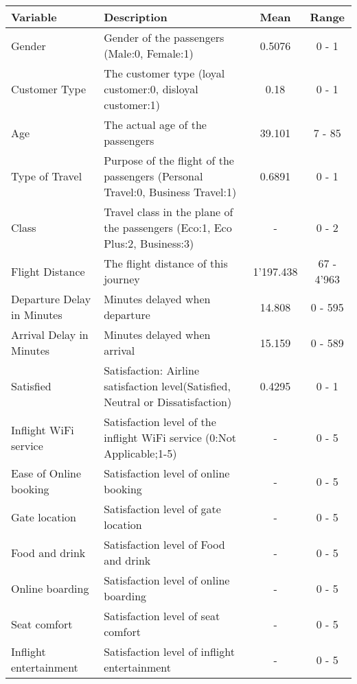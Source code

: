   \begin{landscape}
  \pagestyle{empty}
  \begin{table}[h]
    \centering
    \begin{tabular}{|l|L|c|c|}
      \hline
      \textbf{Variable} & \textbf{Description} & \textbf{Mean} & \textbf{Range} \\
      \hline
      Gender & Gender of the passengers (Male:0, Female:1) & 0.5076 & 0 - 1
      \\\hline 
      Customer Type & The customer type (loyal customer:0, disloyal customer:1) 
      & 0.18 & 0 - 1 \\\hline
      Age & The actual age of the passengers & 39.101 & 7 - 85 \\\hline
      Type of Travel & Purpose of the flight of the passengers
      (Personal Travel:0, Business Travel:1) & 0.6891 & 0 - 1 \\\hline
      Class & Travel class in the plane of the passengers (Eco:1, Eco Plus:2, 
      Business:3) & - & 0 - 2 \\\hline
      Flight Distance & The flight distance of this journey &
      1'197.438 & 67 - 4'963 \\\hline
      Departure Delay in Minutes & Minutes delayed when departure & 14.808 & 0 - 595 \\\hline
      Arrival Delay in Minutes & Minutes delayed when arrival & 15.159 & 0 -
      589 \\\hline
      Satisfied & Satisfaction: Airline satisfaction level(Satisfied, 
      Neutral or Dissatisfaction) & 0.4295 & 0 - 1 \\\hline
      Inflight WiFi service & Satisfaction level of the inflight WiFi service
      (0:Not Applicable;1-5) & - & 0 - 5 \\\hline
      Ease of Online booking & Satisfaction level of online booking & - & 0 - 5
      \\\hline
      Gate location & Satisfaction level of gate location & - & 0 - 5 \\\hline
      Food and drink & Satisfaction level of Food and drink & - & 0 - 5
      \\\hline
      Online boarding & Satisfaction level of online boarding & - & 0 - 5
      \\\hline
      Seat comfort & Satisfaction level of seat comfort & - & 0 - 5 \\\hline
      Inflight entertainment & Satisfaction level of inflight entertainment & -
                             & 0 - 5 \\\hline

\end{tabular}
\end{table}
\end{landscape}
